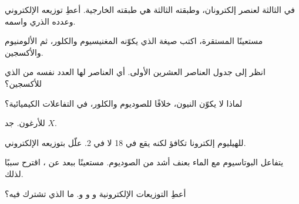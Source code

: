 \begin{exercise}[$\star\star$]\label{exo:g10:electron-shells:7}
في  الثالثة لعنصر إلكترونان، وطبقته الثالثة هي طبقته الخارجية. أعطِ
توزيعه الإلكتروني وعدده الذري واسمه.
\end{exercise}

\begin{exercise}[$\star\star$]\label{exo:g10:electron-shells:8}
مستعينًا  المستقرة، اكتب صيغة  الذي يكوّنه المغنيسيوم
والكلور، ثم الألومنيوم والأكسجين.
\end{exercise}

\begin{exercise}[$\star\star$]\label{exo:g10:electron-shells:9}
انظر إلى جدول العناصر العشرين الأولى. أي العناصر لها العدد نفسه من  الذي للأكسجين؟
\end{exercise}

\begin{exercise}[$\star\star$]\label{exo:g10:electron-shells:10}
لماذا لا يكوّن النيون، خلافًا للصوديوم والكلور،  في التفاعلات
الكيميائية؟
\end{exercise}

\begin{exercise}[$\star\star$]\label{exo:g10:electron-shells:11}
   للأرغون. جد $X$.
\end{exercise}

\begin{exercise}[$\star\star\star$]\label{exo:g10:electron-shells:12}
للهيليوم إلكترونا تكافؤ لكنه يقع في  18 لا في  2. علّل بتوزيعه
الإلكتروني.
\end{exercise}

\begin{exercise}[$\star\star\star$]\label{exo:g10:electron-shells:13}
يتفاعل البوتاسيوم مع الماء بعنف أشد من الصوديوم. مستعينًا ببعد 
عن ، اقترح سببًا لذلك.
\end{exercise}

\begin{exercise}[$\star\star\star$]\label{exo:g10:electron-shells:14}
أعطِ التوزيعات الإلكترونية   و و
و. ما الذي تشترك فيه؟
\end{exercise}

